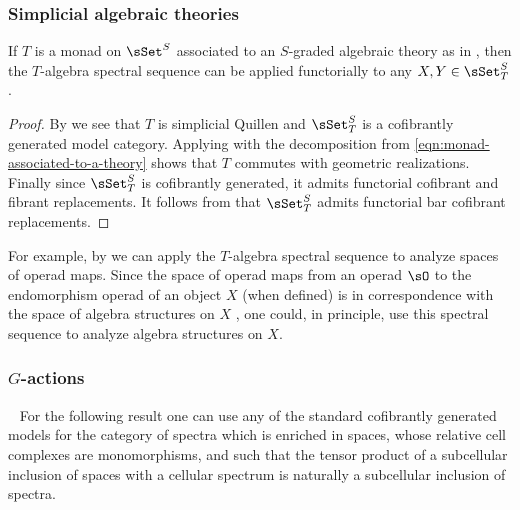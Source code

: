 \documentclass[leqno,oneside,english]{elsarticle}
\begin{document}
\subsubsection{Simplicial algebraic theories}
\begin{thm}
  If $T$ is a monad on $\sSet^S$ associated to an $S$-graded algebraic
  theory as in , then the $T$-algebra
  spectral sequence can be applied functorially to any $X,Y\in
  \sSet^S_T$.
\end{thm}
\begin{proof}
  By  we see that $T$ is
  simplicial Quillen and $\sSet^S_T$ is a cofibrantly generated model category. Applying  with the decomposition from \eqref{eqn:monad-associated-to-a-theory} shows that $T$ commutes with geometric realizations. Finally since $\sSet_T^S$ is cofibrantly generated, it admits functorial cofibrant and fibrant replacements. It follows from  that $\sSet_T^S$ admits functorial bar cofibrant replacements.
\end{proof}

For example, by  we can apply the
$T$-algebra spectral sequence to analyze spaces of operad maps. Since
the space of operad maps from an operad $\sO$ to the endomorphism operad
of an object $X$ (when defined) is in correspondence with the space of algebra
structures on $X$ \cite{Rez96}, one could, in principle, use this spectral
sequence to analyze algebra structures on $X$. 

\subsubsection{\texorpdfstring{$G$}{G}-actions}\label{sec:g-objects-are-admissible}\ \newline
For the following result one can use any of the standard cofibrantly
generated models for the category of spectra which is enriched in spaces, whose relative cell complexes are monomorphisms, and such that the tensor product of a subcellular inclusion of spaces
with a cellular spectrum is naturally a subcellular inclusion of spectra. 
\end{document}
